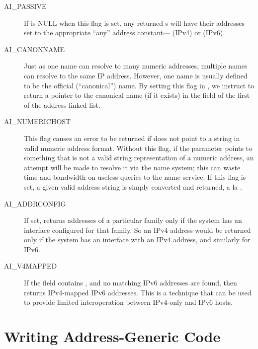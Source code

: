 \begin{description}
\item[AI\_PASSIVE]
If  is NULL when this flag is set, any returned 
s will
have their addresses set to the appropriate ``any'' address
constant--- (IPv4) 
or  (IPv6).

\item[AI\_CANONNAME]
Just as one name can
resolve to many numeric addresses, multiple names can resolve to the
same IP address.
%
However, one name is usually defined to be the official
(``canonical'') name.  By setting this flag in , 
we instruct  to
return a pointer to the canonical name (if it exists) in
the  field of the first  of
the address linked list.

\item[AI\_NUMERICHOST] 
This flag causes an error to be returned if
 does not point to a string in valid numeric address
format.  Without this flag,
if the  parameter points to something that is not a
valid string representation of a numeric address,
an attempt will be made to resolve it via the name system; this can
waste time and bandwidth on useless queries to the name service.
If this flag is set, a given valid address string is simply converted and
returned, a la .

\item[AI\_ADDRCONFIG]
If set,  returns addresses of a particular
family only if the system has an interface configured for that
family.  So an IPv4 address would be returned only if the system has
an interface with an IPv4 address, and similarly for IPv6.

\item[AI\_V4MAPPED]
If the  field contains , and
no matching IPv6 addresses are found,
then  returns IPv4-mapped IPv6 addresses.
This is a technique that can be used to provide limited interoperation
between IPv4-only and IPv6 hosts.
\end{description}

\section{Writing Address-Generic Code}
\label{sect:address-independence}

